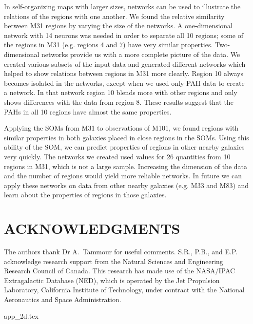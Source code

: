 \documentclass[useAMS,usenatbib]{mn2e}
\begin{document}
In self-organizing maps with larger sizes, networks can be used to illustrate the relations of the regions with one another.
We found the relative similarity between M31 regions by varying the size of the networks.
A one-dimensional network with 14 neurons was needed in order to
separate all 10 regions; some of the regions in M31 (e.g. regions 4 and 7) have very similar properties.
Two-dimensional networks provide us with a more complete picture of the data.
We created various subsets of the input data and generated different networks which helped to show relations between regions in M31 more clearly.
Region 10 always becomes isolated in the networks, except when we  used only PAH data to create a network. %
In that network region 10 blends more with other regions and only shows differences with the data from region 8.
These results suggest that the PAHs in all 10 regions have almost the same properties.

Applying the SOMs from M31 to observations of M101, we found regions with similar properties in both galaxies placed in close regions in the SOMs.
Using this ability of the SOM, we can predict properties of regions in other nearby galaxies very quickly.
The networks we created used values for 26 quantities from 10 regions in M31, which is not a large sample.
Increasing the dimension of the data and the number of regions would yield more reliable networks.
In future we can apply these networks on data from other nearby galaxies (e.g. M33 and M83) and learn about the properties of regions in those galaxies.

 

\section*{ACKNOWLEDGMENTS}
The authors thank Dr A.\ Tammour for useful comments. 
S.R., P.B., and E.P. acknowledge research support from the Natural Sciences and Engineering Research Council of Canada. This research has made use of the NASA/IPAC Extragalactic Database (NED), which is operated by the Jet Propulsion Laboratory, California Institute of Technology, under contract with the National Aeronautics and Space Administration.


{app_2d.tex}
\end{document}
